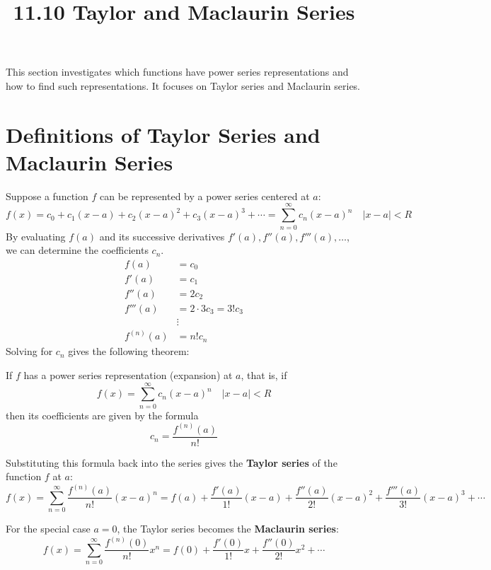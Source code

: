 \documentclass{article}
\title{11.10 Taylor and Maclaurin Series}
\date{}
\author{}
\theoremstyle{mystyle}
\begin{document}
\maketitle

This section investigates which functions have power series representations and how to find such representations. It focuses on Taylor series and Maclaurin series.

\section*{Definitions of Taylor Series and Maclaurin Series}
Suppose a function \(f\) can be represented by a power series centered at \(a\):
\begin{equation}
 f(x) = c_0 + c_1(x-a) + c_2(x-a)^2 + c_3(x-a)^3 + \cdots = \sum_{n=0}^{\infty} c_n (x-a)^n \quad |x-a| < R \label{eq:power_series_def}
\end{equation}
By evaluating \(f(a)\) and its successive derivatives \(f'(a), f''(a), f'''(a), \ldots\), we can determine the coefficients \(c_n\).
\begin{align*}
    f(a) &= c_0 \\
    f'(a) &= c_1 \\
    f''(a) &= 2c_2 \\
    f'''(a) &= 2 \cdot 3 c_3 = 3! c_3 \\
    &\vdots \\
    f^{(n)}(a) &= n! c_n
\end{align*}
Solving for \(c_n\) gives the following theorem:

\begin{tcolorbox}[
    colback=white,
    colframe=orange!80!white,
    title=Theorem 5,
    boxrule=0.5mm,
    arc=3mm
    ]
    If \(f\) has a power series representation (expansion) at \(a\), that is, if
    \[ f(x) = \sum_{n=0}^{\infty} c_n (x-a)^n \quad |x-a| < R \]
    then its coefficients are given by the formula
    \[ c_n = \dfrac{f^{(n)}(a)}{n!} \]
\end{tcolorbox}

Substituting this formula back into the series gives the \textbf{Taylor series} of the function \(f\) at \(a\):
\begin{equation}
 f(x) = \sum_{n=0}^{\infty} \dfrac{f^{(n)}(a)}{n!} (x-a)^n = f(a) + \dfrac{f'(a)}{1!}(x-a) + \dfrac{f''(a)}{2!}(x-a)^2 + \dfrac{f'''(a)}{3!}(x-a)^3 + \cdots \label{eq:taylor_series}
\end{equation}

For the special case \(a=0\), the Taylor series becomes the \textbf{Maclaurin series}:
\begin{equation}
 f(x) = \sum_{n=0}^{\infty} \dfrac{f^{(n)}(0)}{n!} x^n = f(0) + \dfrac{f'(0)}{1!}x + \dfrac{f''(0)}{2!}x^2 + \cdots \label{eq:maclaurin_series}
\end{equation}
\end{document}
